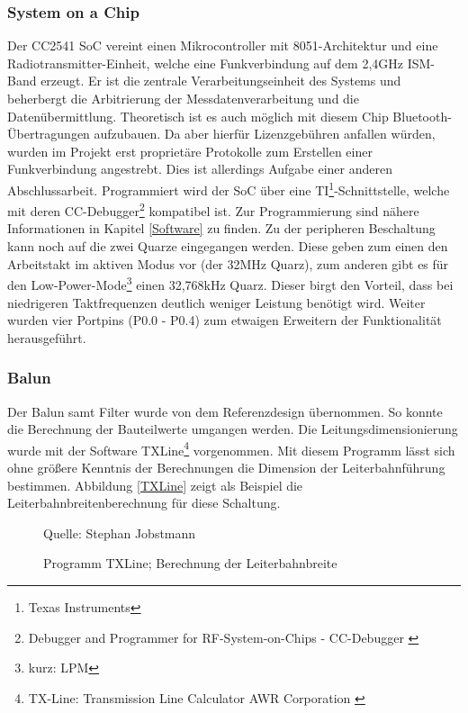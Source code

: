 \documentclass[12pt]{scrreprt} %
\begin{document}
\subsubsection{System on a Chip}
Der CC2541 SoC vereint einen Mikrocontroller mit 8051-Architektur und eine Radiotransmitter-Einheit, welche eine Funkverbindung auf dem 2,4GHz ISM-Band erzeugt. Er ist die zentrale Verarbeitungseinheit des Systems und beherbergt die Arbitrierung der Messdatenverarbeitung und die Datenübermittlung.  Theoretisch ist es auch möglich mit diesem Chip Bluetooth-Übertragungen aufzubauen. Da aber hierfür Lizenzgebühren anfallen würden, wurden im Projekt erst proprietäre Protokolle zum Erstellen einer Funkverbindung angestrebt. Dies ist allerdings Aufgabe einer anderen Abschlussarbeit. Programmiert wird der SoC über eine TI\footnote{Texas Instruments}-Schnittstelle, welche mit deren CC-Debugger\footnote{Debugger and Programmer for RF-System-on-Chips - CC-Debugger \citep{CCDEBUG}} kompatibel ist. Zur Programmierung sind nähere Informationen in Kapitel \vref{Software} zu finden. Zu der peripheren Beschaltung kann noch auf die zwei Quarze eingegangen werden. Diese geben zum einen den Arbeitstakt im aktiven Modus vor (der 32MHz Quarz), zum anderen gibt es für den Low-Power-Mode\footnote{kurz: LPM} einen 32,768kHz Quarz. Dieser birgt den Vorteil, dass bei niedrigeren Taktfrequenzen deutlich weniger Leistung benötigt wird. Weiter wurden vier Portpins (P0.0 - P0.4) zum etwaigen Erweitern der Funktionalität herausgeführt. 
\subsubsection{Balun}
Der Balun samt Filter wurde von dem Referenzdesign übernommen. So konnte die Berechnung der Bauteilwerte umgangen werden. Die Leitungsdimensionierung wurde mit der Software TXLine\footnote{TX-Line: Transmission Line Calculator AWR Corporation \citep{txline}} vorgenommen. Mit diesem Programm lässt sich ohne größere Kenntnis der Berechnungen die Dimension der Leiterbahnführung bestimmen. Abbildung \vref{TXLine} zeigt als Beispiel die Leiterbahnbreitenberechnung für diese Schaltung.
\begin{figure}
\centering
\caption{Programm TXLine; Berechnung der Leiterbahnbreite}
Quelle: Stephan Jobstmann
\label{TXLine}
\end{figure}
\end{document}
